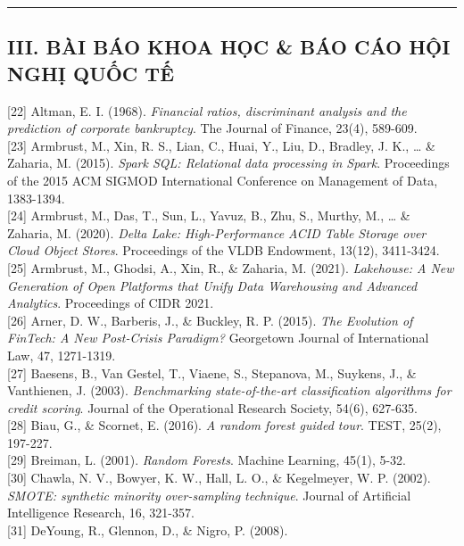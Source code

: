 \documentclass[
  13pt,
  a4paper,
]{report}
\begin{document}
\begin{center}\rule{0.5\linewidth}{0.5pt}\end{center}

\subsection{III. BÀI BÁO KHOA HỌC \& BÁO CÁO HỘI NGHỊ QUỐC
TẾ}\label{iii.-buxe0i-buxe1o-khoa-hux1ecdc-buxe1o-cuxe1o-hux1ed9i-nghux1ecb-quux1ed1c-tux1ebf}

{[}22{]} Altman, E. I. (1968). \emph{Financial ratios, discriminant
analysis and the prediction of corporate bankruptcy}. The Journal of
Finance, 23(4), 589-609.\\
{[}23{]} Armbrust, M., Xin, R. S., Lian, C., Huai, Y., Liu, D., Bradley,
J. K., \ldots{} \& Zaharia, M. (2015). \emph{Spark SQL: Relational data
processing in Spark}. Proceedings of the 2015 ACM SIGMOD International
Conference on Management of Data, 1383-1394.\\
{[}24{]} Armbrust, M., Das, T., Sun, L., Yavuz, B., Zhu, S., Murthy, M.,
\ldots{} \& Zaharia, M. (2020). \emph{Delta Lake: High-Performance ACID
Table Storage over Cloud Object Stores}. Proceedings of the VLDB
Endowment, 13(12), 3411-3424.\\
{[}25{]} Armbrust, M., Ghodsi, A., Xin, R., \& Zaharia, M. (2021).
\emph{Lakehouse: A New Generation of Open Platforms that Unify Data
Warehousing and Advanced Analytics}. Proceedings of CIDR 2021.\\
{[}26{]} Arner, D. W., Barberis, J., \& Buckley, R. P. (2015). \emph{The
Evolution of FinTech: A New Post-Crisis Paradigm?} Georgetown Journal of
International Law, 47, 1271-1319.\\
{[}27{]} Baesens, B., Van Gestel, T., Viaene, S., Stepanova, M.,
Suykens, J., \& Vanthienen, J. (2003). \emph{Benchmarking
state-of-the-art classification algorithms for credit scoring}. Journal
of the Operational Research Society, 54(6), 627-635.\\
{[}28{]} Biau, G., \& Scornet, E. (2016). \emph{A random forest guided
tour}. TEST, 25(2), 197-227.\\
{[}29{]} Breiman, L. (2001). \emph{Random Forests}. Machine Learning,
45(1), 5-32.\\
{[}30{]} Chawla, N. V., Bowyer, K. W., Hall, L. O., \& Kegelmeyer, W. P.
(2002). \emph{SMOTE: synthetic minority over-sampling technique}.
Journal of Artificial Intelligence Research, 16, 321-357.\\
{[}31{]} DeYoung, R., Glennon, D., \& Nigro, P. (2008).
\end{document}

